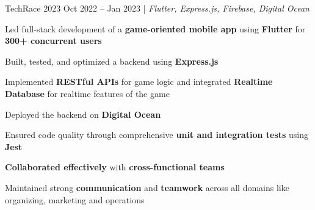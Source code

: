 \resumeSubheadings
{TechRace 2023 }
{Oct 2022 -- Jan 2023}
{}{}{| \textit{Flutter, Express.js, Firebase, Digital Ocean}}
\resumeItemListStart
\item Led full-stack development of a \textbf{game-oriented mobile app} using \textbf{Flutter} for \textbf{300+ concurrent users}
\item Built, tested, and optimized a backend using \textbf{Express.js}
\item Implemented \textbf{RESTful APIs} for game logic and integrated \textbf{Realtime Database} for realtime features of the game
\item Deployed the backend on \textbf{Digital Ocean}
\item Ensured code quality through comprehensive \textbf{unit and integration tests} using \textbf{Jest}
\item \textbf{Collaborated effectively} with \textbf{cross-functional teams}
\item Maintained strong \textbf{communication} and \textbf{teamwork} across all domains like organizing, marketing and operations
\resumeItemListEnd
